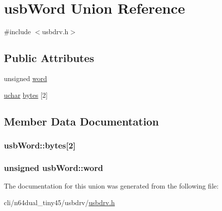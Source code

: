 \hypertarget{unionusbWord}{\section{usb\-Word Union Reference}
\label{unionusbWord}
}


{\ttfamily \#include $<$usbdrv.\-h$>$}

\subsection*{Public Attributes}
\begin{DoxyCompactItemize}
\item 
unsigned \hyperlink{unionusbWord_a5c18356318175be1ad83c8acab90bf66}{word}
\item 
\hyperlink{usbdrv_8h_aa8ddf20cdd716b652e76e23e5e700893}{uchar} \hyperlink{unionusbWord_a3efd0ec82e53de09193e9de269434334}{bytes} \mbox{[}2\mbox{]}
\end{DoxyCompactItemize}


\subsection{Member Data Documentation}
\hypertarget{unionusbWord_a3efd0ec82e53de09193e9de269434334}{
\subsubsection[{bytes}]{ usb\-Word\-::bytes\mbox{[}2\mbox{]}}}\label{unionusbWord_a3efd0ec82e53de09193e9de269434334}
\hypertarget{unionusbWord_a5c18356318175be1ad83c8acab90bf66}{
\subsubsection[{word}]{\setlength{\rightskip}{0pt plus 5cm}unsigned usb\-Word\-::word}}\label{unionusbWord_a5c18356318175be1ad83c8acab90bf66}


The documentation for this union was generated from the following file\-:\begin{DoxyCompactItemize}
\item 
cli/n64dual\-\_\-tiny45/usbdrv/\hyperlink{usbdrv_8h}{usbdrv.\-h}\end{DoxyCompactItemize}
